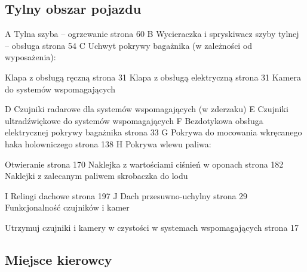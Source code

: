 \subsection{Tylny obszar pojazdu}



A Tylna szyba – ogrzewanie \guillemotright strona 60
B Wycieraczka i spryskiwacz szyby tylnej – obsługa \guillemotright strona 54
C Uchwyt pokrywy bagażnika (w zależności od wyposażenia):
\begin{itemizeTriangle}
	\itemTriangle Klapa z obsługą ręczną \guillemotright strona 31
	\itemTriangle Klapa z obsługą elektryczną \guillemotright strona 31
	\itemTriangle Kamera do systemów wspomagających
\end{itemizeTriangle}
D Czujniki radarowe dla systemów wspomagających (w zderzaku)
E Czujniki ultradźwiękowe do systemów wspomagających
F Bezdotykowa obsługa elektrycznej pokrywy bagażnika \guillemotright strona 33
G Pokrywa do mocowania wkręcanego haka holowniczego \guillemotright strona 138
H Pokrywa wlewu paliwa:
\begin{itemizeTriangle}
	\itemTriangle Otwieranie \guillemotright strona 170
	\itemTriangle Naklejka z wartościami ciśnień w oponach \guillemotright strona 182
	\itemTriangle Naklejki z zalecanym paliwem
	\itemTriangle skrobaczka do lodu
\end{itemizeTriangle}
I Relingi dachowe \guillemotright strona 197
J Dach przesuwno-uchylny \guillemotright strona 29
Funkcjonalność czujników i kamer
\begin{itemizeArrow}
	\itemArrow Utrzymuj czujniki i kamery w czystości w systemach wspomagających \guillemotright strona 17
\end{itemizeArrow}

\subsection{Miejsce kierowcy}



